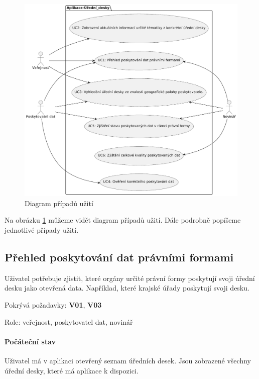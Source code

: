 \begin{figure} 
\includegraphics[width=\textwidth]{cs/obrazky/use-case-diagram.pdf}
\caption{Diagram případů užití}
\label{fig:use-case}
\end{figure}

Na obrázku \ref{fig:use-case} můžeme vidět diagram případů užití. Dále podrobně popíšeme jednotlivé případy užití.


\subsection{Přehled poskytování dat právními formami}
\label{use-case:who}

Uživatel potřebuje zjistit, které orgány určité právní formy poskytují svoji úřední desku jako otevřená data. Například, které krajské úřady poskytují svoji desku.

Pokrývá požadavky: \textbf{V01}, \textbf{V03}

Role: veřejnost, poskytovatel dat, novinář

\paragraph{Počáteční stav} 
Uživatel má v aplikaci otevřený seznam úředních desek. Jsou zobrazené všechny úřední desky, které má aplikace k dispozici.

